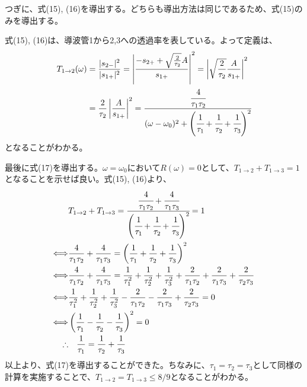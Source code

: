 \documentclass[a4paper,11pt,dvipdfmx]{jsarticle}
\begin{document}
\begin{enumerate}
  つぎに、式(15), (16)を導出する。どちらも導出方法は同じであるため、式(15)のみを導出する。

  式(15), (16)は、導波管1から2,3への透過率を表している。よって定義は、
  \begin{align*}
    T_{1 \rightarrow 2} (\omega) &= \frac{|s_{2-}|^2}{|s_{1+}|^2} = \left| \frac{- s_{2+} + \sqrt{\frac{2}{\tau_2} } A}{s_{1+}} \right|^2 = \left| \sqrt{\frac{2}{\tau_2}} \frac{A}{s_{1+}} \right|^2 \\
    &= \frac{2}{\tau_2} \left| \frac{A}{s_{1+}} \right|^2 = \cfrac{\cfrac{4}{\tau_1 \tau_2}}{(\omega - \omega_0)^2 + \left( \cfrac{1}{\tau_1} + \cfrac{1}{\tau_2} + \cfrac{1}{\tau_3} \right)^2}
  \end{align*}
  となることがわかる。

  最後に式(17)を導出する。$\omega = \omega_0$において$R(\omega)=0$として、$T_{1 \to 2} + T_{1 \to 3} = 1$となることを示せば良い。式(15), (16)より、
  \begin{align*}
    & T_{1 \to 2} + T_{1 \to 3} = \cfrac{\cfrac{4}{\tau_1 \tau_2} + \cfrac{4}{\tau_1 \tau_3}}{\left( \cfrac{1}{\tau_1} +  \cfrac{1}{\tau_2} +  \cfrac{1}{\tau_3} \right)^2}  = 1 \\
    \Longleftrightarrow & \frac{4}{\tau_1 \tau_2} + \frac{4}{\tau_1 \tau_3} = \left( \frac{1}{\tau_1} +  \frac{1}{\tau_2} +  \frac{1}{\tau_3} \right)^2 \\
    \Longleftrightarrow & \frac{4}{\tau_1 \tau_2} + \frac{4}{\tau_1 \tau_3} = \frac{1}{\tau_1^2} + \frac{1}{\tau_2^2} + \frac{1}{\tau_3^2} + \frac{2}{\tau_1 \tau_2} + \frac{2}{\tau_1 \tau_3} + \frac{2}{\tau_2 \tau_3} \\
    \Longleftrightarrow & \frac{1}{\tau_1^2} + \frac{1}{\tau_2^2} + \frac{1}{\tau_3^2} - \frac{2}{\tau_1 \tau_2} - \frac{2}{\tau_1 \tau_3} + \frac{2}{\tau_2 \tau_3} = 0 \\
    \Longleftrightarrow & \left( \frac{1}{\tau_1} - \frac{1}{\tau_2} - \frac{1}{\tau_3} \right)^2= 0 \\
    \therefore &\quad  \frac{1}{\tau_1} = \frac{1}{\tau_2} + \frac{1}{\tau_3} 
  \end{align*}
  以上より、式(17)を導出することができた。ちなみに、$\tau_1 = \tau_2 = \tau_3$として同様の計算を実施することで、$T_{1 \to 2} = T_{1 \to 3} \leq 8/9$となることがわかる。
\end{enumerate}
    
\end{document}
